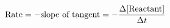 \documentclass[preview]{standalone}
\begin{document}
\begin{align*}
\special{dvisvgm:raw <g id='unique000'>}\text{Rate} = -\text{slope of tangent} = -\frac{\Delta[\text{Reactant}]}{\Delta t}\special{dvisvgm:raw </g>}
\end{align*}
\end{document}
